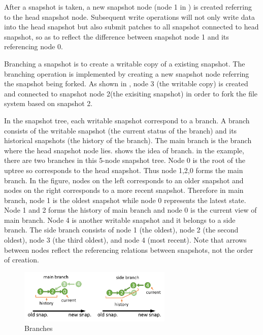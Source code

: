     After a snapshot is taken, a new snapshot node (node 1 in ) is created referring to the head snapshot node. Subsequent write operations will not only write data into the head snapshot but also submit patches to all snapshot connected to head snapshot, so as to reflect the difference between snapshot node 1 and its referencing node 0.

    Branching a snapshot is to create a writable copy of a existing snapshot. The branching operation is implemented by creating a new snapshot node referring the snapshot being forked. As shown in , node 3 (the writable copy) is created and connected to snapshot node 2(the exisiting snapshot) in order to fork the file system based on snapshot 2.

    In the snapshot tree, each writable snapshot correspond to a branch. A branch consists of the writable snapshot (the current status of the branch) and its historical snapshots (the history of the branch). The main branch is the branch where the head snapshot node lies.  shows the idea of branch. in the example, there are two branches in this 5-node snapshot tree. Node 0 is the root of the uptree so corresponds to the head snapshot. Thus node 1,2,0 forms the main branch. In the figure, nodes on the left corresponds to an older snapshot and nodes on the right corresponds to a more recent snapshot. Therefore in main branch, node 1 is the oldest snapshot while node 0 represents the latest state. Node 1 and 2 forms the history of main branch and node 0 is the current view of main branch. Node 4 is another writable snapshot and it belongs to a side branch. The side branch consists of node 1 (the oldest), node 2 (the second oldest), node 3 (the third oldest), and node 4 (most recent). Note that arrows between nodes reflect the referencing relations between snapshots, not the order of creation.

\begin{figure}[hbtp]
\centering
\includegraphics[width=0.65\textwidth]{Chapter-4/figs/fig22.png}
\caption{Branches}
\label{fig:branches}
\end{figure}

